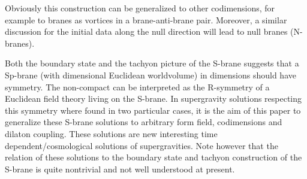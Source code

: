 \documentclass[a4paper,aps,nofootinbib,showpacs,preprint]{revtex4}
\begin{document}
Obviously this construction can be generalized to other
codimensions, for example to branes as vortices in a
brane-anti-brane pair. Moreover, a similar discussion for the
initial data along the null direction will lead to null branes
(N-branes).

Both the boundary state and the tachyon picture of the S-brane
suggests that a Sp-brane (with \coordHE{} dimensional Euclidean
worldvolume) in \coordHE{} dimensions should have \coordHE{} symmetry. The non-compact \coordHE{} can be
interpreted as the R-symmetry of a Euclidean field theory living
on the S-brane. In \cite{GS02} supergravity solutions respecting
this symmetry where found in two particular cases, it is the aim
of this paper to generalize these S-brane solutions to arbitrary
form field, codimensions and dilaton coupling. These solutions are
new interesting time dependent/cosmological solutions of
supergravities. Note however that the relation of these solutions
to the boundary state and tachyon construction of the S-brane is
quite nontrivial and not well understood at present.


\end{document}
